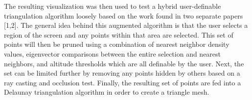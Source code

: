 The resulting visualization was then used to test a hybrid user-definable
triangulation algorithm loosely based on the work found in two separate papers
[1,2]. The general idea behind this augmented algorithm is that the user selects
a region of the screen and any points within that area are selected. This set of
points will then be pruned using a combination of nearest neighbor density
values, eigenvector comparisons between the entire selection and nearest
neighbors, and altitude thresholds which are all definable by the user. Next,
the set can be limited further by removing any points hidden by others based on
a ray casting and occlusion test. Finally, the resulting set of points are fed
into a Delaunay triangulation algorithm in order to create a triangle mesh.